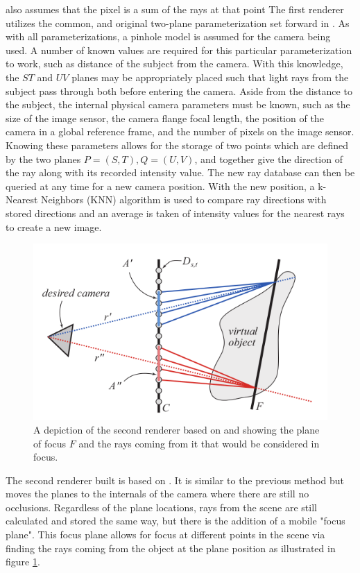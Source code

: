 \documentclass[12pt]{report}
\begin{document}
also assumes that the pixel is a sum of the rays at that point
The first renderer utilizes the common, and original two-plane parameterization set forward in \cite{Levoy96}. As with all parameterizations, a pinhole model is assumed for the camera being used. A number of known values are required for this particular parameterization to work, such as distance of the subject from the camera. With this knowledge, the $ST$ and $UV$ planes may be appropriately placed such that light rays from the subject pass through both before entering the camera. Aside from the distance to the subject, the internal physical camera parameters must be known, such as the size of the image sensor, the camera flange focal length, the position of the camera in a global reference frame, and the number of pixels on the image sensor. Knowing these parameters allows for the storage of two points which are defined by the two planes $P=(S,T), Q=(U,V)$, and together give the direction of the ray along with its recorded intensity value. The new ray database can then be queried at any time for a new camera position. With the new position, a k-Nearest Neighbors (KNN) algorithm is used to compare ray directions with stored directions and an average is taken of intensity values for the nearest rays to create a new image.

\begin{figure}[!ht]
	\centering
	\includegraphics[scale=0.7]{mobile_focus.png}
	\caption{A depiction of the second renderer based on \cite{Isaksen01} and showing the plane of focus $F$ and the rays coming from it that would be considered in focus.}
	\label{fig:mobile_focus}
\end{figure}

The second renderer built is based on \cite{Isaksen01}. It is similar to the previous method but moves the planes to the internals of the camera where there are still no occlusions. Regardless of the plane locations, rays from the scene are still calculated and stored the same way, but there is the addition of a mobile "focus plane". This focus plane allows for focus at different points in the scene via finding the rays coming from the object at the plane position as illustrated in figure \ref{fig:mobile_focus}.
 
\end{document}
